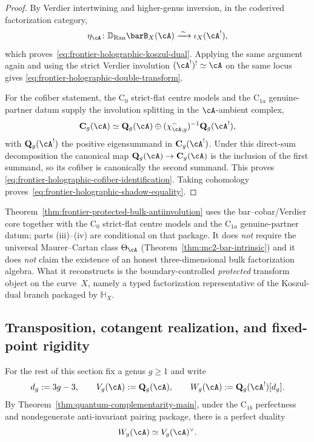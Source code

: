 \begin{proof}
By Verdier intertwining and higher-genus inversion, in the coderived
factorization category,
\[
\eta_\cA\colon
\mathbb D_{\operatorname{Ran}}\barB_X(\cA)
\xrightarrow{\;\sim\;}
\iota_X(\cA^!),
\]
which proves~\eqref{eq:frontier-holographic-koszul-dual}. Applying the same
argument again and using the strict Verdier involution
$(\cA^!)^!\simeq \cA$ on the same locus gives
\eqref{eq:frontier-holographic-double-transform}.

For the cofiber statement, the $\mathrm C_0$ strict-flat centre
models and the $\mathrm C_{1a}$ genuine-partner datum supply the
involution splitting in the $\cA$-ambient complex,
\[
\mathbf C_g(\cA)
\simeq
\mathbf Q_g(\cA)\oplus (\chi^-_{\cA;g})^{-1}\mathbf Q_g(\cA^!),
\]
with $\mathbf Q_g(\cA^!)$ the positive eigensummand in
$\mathbf C_g(\cA^!)$.
Under this direct-sum decomposition the canonical map
$\mathbf Q_g(\cA)\to \mathbf C_g(\cA)$ is the inclusion of the first summand,
so its cofiber is canonically the second summand. This proves
\eqref{eq:frontier-holographic-cofiber-identification}. Taking cohomology
proves~\eqref{eq:frontier-holographic-shadow-equality}.
\end{proof}

\begin{remark}
\label{rem:frontier-protected-bulk-antiinvolution-deps}
Theorem~\ref{thm:frontier-protected-bulk-antiinvolution} uses the
bar--cobar/Verdier core together with the $\mathrm C_0$ strict-flat
centre models and the $\mathrm C_{1a}$ genuine-partner datum; parts
(iii)--(iv) are conditional on that package. It does \emph{not}
require the universal Maurer--Cartan class $\Theta_{\cA}$
(Theorem~\ref{thm:mc2-bar-intrinsic}) and it
does \emph{not} claim the existence of an honest three-dimensional bulk
factorization algebra. What it reconstructs is the boundary-controlled
\emph{protected} transform object on the curve~$X$, namely a typed
factorization representative of the Koszul-dual branch packaged by
$\mathbb H_X$.
\end{remark}

\subsection{Transposition, cotangent realization, and fixed-point rigidity}
\label{subsec:frontier-transposition-cotangent-fixed}

For the rest of this section fix a genus $g\ge 1$ and write
\begin{equation}\label{eq:frontier-dg-shift}
 d_g:=3g-3,
 \qquad
 V_g(\cA):=\mathbf Q_g(\cA),
 \qquad
 W_g(\cA):=\mathbf Q_g(\cA^!)[d_g].
\end{equation}
By Theorem~\ref{thm:quantum-complementarity-main}, under the
$\mathrm C_{1b}$ perfectness and nondegenerate anti-invariant pairing
package, there is a perfect duality
\begin{equation}\label{eq:frontier-vg-wg-duality}
W_g(\cA)\simeq V_g(\cA)^\vee.
\end{equation}

